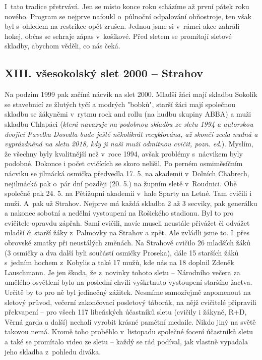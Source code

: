 \documentclass[a5paper, 11pt, twoside]{article}
\begin{document}
I~tato tradice přetrvává. Jen se místo konce roku scházíme až první
pátek roku nového. Program se nejprve nafoukl o~půlnoční odpalování
ohňostroje, ten však byl s~ohledem na restrikce opět zrušen. Jednou jsme
si v~rámci akce zahráli hokej, občas se sehraje zápas v~košíkové. Před
sletem se promítají sletové skladby, abychom věděli, co nás čeká.

\subsection{XIII. všesokolský slet 2000 --
Strahov}

Na podzim 1999 pak začíná nácvik na slet 2000. Mladší žáci mají skladbu
Sokolík se stavebnicí ze žlutých tyčí a modrých "bobků", starší žáci
mají společnou skladbu se žákyněmi v~rytmu rock and rollu (na hudbu
skupiny ABBA) a muži skladbu Chlapáci (\textit{která navazuje na podobnou
skladbu ze sletu 1994 a autorskou dvojicí Pavelka Dosedla bude ještě
několikrát recyklována, až skončí zcela nudná a vyprázdněná na sletu
2018, kdy ji naši muži odmítnou cvičit, pozn. ed}.). Myslím, že všechny
byly kvalitnější než v~roce 1994, avšak problémy s~nácvikem byly
podobné. Dokonce i počet cvičících se skoro nelišil. Po perném
osmiměsíčním nácviku se jilmácká osmička předvedla 17. 5. na akademii
v~Dolních Chabrech, nejilmácká pak o~pár dní později (20. 5.) na župním
sletě v~Roudnici. Obě společně pak 24. 5. na Pětižupní akademii v~hale
Sparty na Letné. Tam cvičili i muži. A~pak už Strahov. Nejprve má každá
skladba 2 až 3 secviky, pak generálku a nakonec sobotní a nedělní
vystoupení na Rošického stadionu. Byl to pro cvičitele opravdu zápřah.
Sami cvičili, navíc museli neustále přivážet či odvážet mladší či starší
žáky z~Palmovky na Strahov a zpět. Ale zvládli jsme to. I~přes obrovské
zmatky při neustálých změnách. Na Strahově cvičilo 26 mladších žáků (3
osmičky a dva další byli součástí osmičky Proseka), dále 15 starších
žáků s~jedním hochem z~Kobylis a také 17 mužů, kde nás na 18 doplnil
Zdeněk Lauschmann. Je jen škoda, že z~novinky tohoto sletu -- Národního
večera za umělého osvětlení bylo na poslední chvíli vyškrtnuto
vystoupení staršího žactva. Určitě by to pro ně byl jedinečný zážitek.
Nesmíme samozřejmě zapomenout na sletový průvod, večerní zakončovací
posletový táborák, na nějž cvičitelé připravili překvapení -- pro všech
117 libeňských účastníků sletu (cvičily i žákyně, R+D, Věrná garda a
další) nechali vyrobit krásné pamětní medaile. Nikdo jiný na světě
takovou nemá. Kromě toho proběhlo v~listopadu společné focení účastníků
sletu a také se promítalo video ze sletu -- každý se rád podíval, jak
vlastně vypadala jeho skladba z~pohledu diváka.
\end{document}

